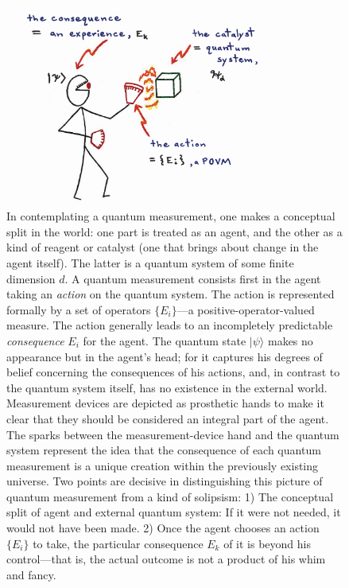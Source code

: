 \documentclass[aps,pra,superscriptaddress,12pt,tightenlines,nofootinbib]{revtex4-2}
\begin{document}
\begin{figure}
\begin{center}
\includegraphics[height=2.6in]{paulianidea-n3}
\bigskip\caption{ In contemplating a quantum measurement, one makes a conceptual split in the world:  one part is treated as an agent, and the other as a kind of reagent or catalyst (one that brings about change in the agent itself).  The latter is a quantum system of some finite dimension $d$.  A quantum measurement consists first in the agent taking an {\it action\/} on the quantum system.  The action is represented formally by a set of operators $\{E_i\}$---a positive-operator-valued measure. The action generally leads to an incompletely predictable {\it consequence\/} $E_i$ for the agent.  The quantum state $|\psi\rangle$ makes no appearance but in the agent's head; for it captures his degrees of belief concerning the consequences of his actions, and, in contrast to the quantum system itself, has no existence in the external world.  Measurement devices are depicted as prosthetic hands to make it clear that they should be considered an integral part of the agent.  The sparks between the measurement-device hand and the quantum system represent the idea that the consequence of each quantum measurement is a unique creation within the previously existing universe.  Two points are decisive in distinguishing this picture of quantum measurement from a kind of solipsism:  1) The conceptual split of agent and external quantum system: If it were not needed, it would not have been made. 2) Once the agent chooses an action $\{E_i\}$ to take, the particular consequence $E_k$ of it is beyond his control---that is, the actual outcome is not a product of his whim and fancy.}
\end{center}
\end{figure}
\end{document}
